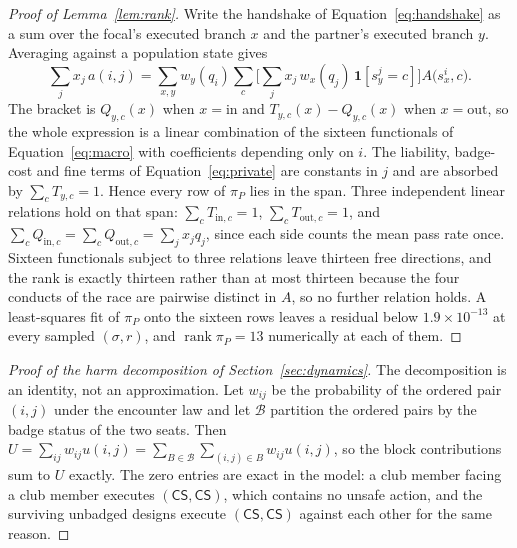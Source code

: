 \documentclass[11pt,a4paper]{article}
\theoremstyle{definition}
\newcommand{\CS}{\textsf{CS}}
\newcommand{\piP}{\pi_{P}}
\begin{document}
\begin{proof}[Proof of Lemma~\ref{lem:rank}]
Write the handshake of Equation~\eqref{eq:handshake} as a sum over the focal's
executed branch $x$ and the partner's executed branch $y$. Averaging against a
population state gives
\[
\sum_j x_j\,a(i,j)
 = \sum_{x, y} w_y(q_i) \sum_{c} \Big[\sum_j x_j\, w_x(q_j)\,
   \mathbf{1}[s^{j}_{y} = c]\Big] A\big(s^{i}_{x}, c\big).
\]
The bracket is $Q_{y,c}(x)$ when $x = \mathrm{in}$ and
$T_{y,c}(x) - Q_{y,c}(x)$ when $x = \mathrm{out}$, so the whole expression is a
linear combination of the sixteen functionals of Equation~\eqref{eq:macro} with
coefficients depending only on $i$. The liability, badge-cost and fine terms of
Equation~\eqref{eq:private} are constants in $j$ and are absorbed by
$\sum_c T_{y,c} = 1$. Hence every row of $\piP$ lies in the span. Three
independent linear relations hold on that span: $\sum_c T_{\mathrm{in},c} = 1$,
$\sum_c T_{\mathrm{out},c} = 1$, and
$\sum_c Q_{\mathrm{in},c} = \sum_c Q_{\mathrm{out},c} = \sum_j x_j q_j$, since
each side counts the mean pass rate once. Sixteen functionals subject to three
relations leave thirteen free directions, and the rank is exactly thirteen
rather than at most thirteen because the four conducts of the race are
pairwise distinct in $A$, so no further relation holds. A least-squares fit of
$\piP$ onto the sixteen rows leaves a residual below
$1.9 \times 10^{-13}$ at every sampled $(\sigma, r)$, and
$\operatorname{rank} \piP = 13$ numerically at each of them.
\end{proof}

\begin{proof}[Proof of the harm decomposition of Section~\ref{sec:dynamics}]
The decomposition is an identity, not an approximation. Let $w_{ij}$ be the
probability of the ordered pair $(i,j)$ under the encounter law and let
$\mathcal{B}$ partition the ordered pairs by the badge status of the two seats.
Then $U = \sum_{ij} w_{ij} u(i,j) = \sum_{B \in \mathcal{B}} \sum_{(i,j) \in B}
w_{ij} u(i,j)$, so the block contributions sum to $U$ exactly. The zero entries
are exact in the model: a club member facing a club member executes
$(\CS, \CS)$, which contains no unsafe action, and the surviving unbadged
designs execute $(\CS, \CS)$ against each other for the same reason.
\end{proof}
\end{document}
